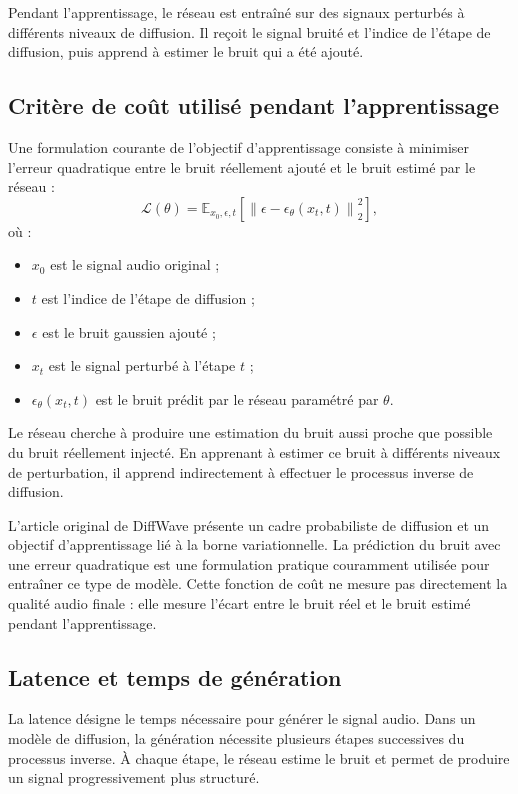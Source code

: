 Pendant l'apprentissage, le réseau est entraîné sur des signaux perturbés à différents niveaux de diffusion. Il reçoit le signal bruité et l'indice de l'étape de diffusion, puis apprend à estimer le bruit qui a été ajouté.

\subsection{Critère de coût utilisé pendant l'apprentissage}

Une formulation courante de l'objectif d'apprentissage consiste à minimiser l'erreur quadratique entre le bruit réellement ajouté et le bruit estimé par le réseau :
\begin{equation}
\mathcal{L}(\theta)=
\mathbb{E}_{x_0,\epsilon,t}
\left[
\left\|
\epsilon-\epsilon_\theta(x_t,t)
\right\|_2^2
\right],
\end{equation}
où :
\begin{itemize}
    \item $x_0$ est le signal audio original ;
    \item $t$ est l'indice de l'étape de diffusion ;
    \item $\epsilon$ est le bruit gaussien ajouté ;
    \item $x_t$ est le signal perturbé à l'étape $t$ ;
    \item $\epsilon_\theta(x_t,t)$ est le bruit prédit par le réseau paramétré par $\theta$.
\end{itemize}

Le réseau cherche à produire une estimation du bruit aussi proche que possible du bruit réellement injecté. En apprenant à estimer ce bruit à différents niveaux de perturbation, il apprend indirectement à effectuer le processus inverse de diffusion.

L'article original de DiffWave présente un cadre probabiliste de diffusion et un objectif d'apprentissage lié à la borne variationnelle. La prédiction du bruit avec une erreur quadratique est une formulation pratique couramment utilisée pour entraîner ce type de modèle. Cette fonction de coût ne mesure pas directement la qualité audio finale : elle mesure l'écart entre le bruit réel et le bruit estimé pendant l'apprentissage.

\subsection{Latence et temps de génération}

La latence désigne le temps nécessaire pour générer le signal audio. Dans un modèle de diffusion, la génération nécessite plusieurs étapes successives du processus inverse. À chaque étape, le réseau estime le bruit et permet de produire un signal progressivement plus structuré.

